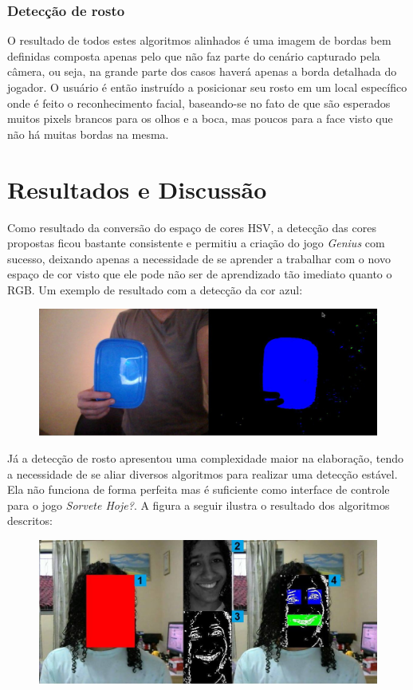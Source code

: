 \documentclass{sciposter}
\begin{document}
\begin{multicols}{3}
\subsubsection{Detecção de rosto}
O resultado de todos estes algoritmos alinhados é uma imagem de bordas bem definidas composta apenas pelo que não faz parte do cenário capturado pela câmera, ou seja, na grande parte dos casos haverá apenas a borda detalhada do jogador. O usuário é então instruído a posicionar seu rosto em um local específico onde é feito o reconhecimento facial, baseando-se no fato de que são esperados muitos pixels brancos para os olhos e a boca, mas poucos para a face visto que não há muitas bordas na mesma.

\section{Resultados e Discussão}

Como resultado da conversão do espaço de cores HSV, a detecção das cores propostas ficou bastante consistente e permitiu a criação do jogo \textit{Genius} com sucesso, deixando apenas a necessidade de se aprender a trabalhar com o novo espaço de cor visto que ele pode não ser de aprendizado tão imediato quanto o RGB. Um exemplo de resultado com a detecção da cor azul:

\begin{figure}[ht]
\centering
\includegraphics[width=8in]{img2.jpg}
\end{figure}

Já a detecção de rosto apresentou uma complexidade maior na elaboração, tendo a necessidade de se aliar diversos algoritmos para realizar uma detecção estável. Ela não funciona de forma perfeita mas é suficiente como interface de controle para o jogo \textit{Sorvete Hoje?}. A figura a seguir ilustra o resultado dos algoritmos descritos:

\begin{figure}[ht]
\centering
\includegraphics[width=8in]{img5.jpg}
\end{figure}


\end{multicols}
\end{document}
